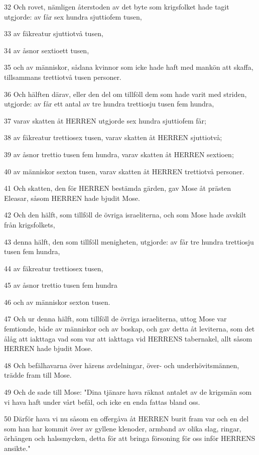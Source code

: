 \par 32 Och rovet, nämligen återstoden av det byte som krigsfolket hade tagit utgjorde: av får sex hundra sjuttiofem tusen,
\par 33 av fäkreatur sjuttiotvå tusen,
\par 34 av åsnor sextioett tusen,
\par 35 och av människor, sådana kvinnor som icke hade haft med mankön att skaffa, tillsammans trettiotvå tusen personer.
\par 36 Och hälften därav, eller den del om tillföll dem som hade varit med striden, utgjorde: av får ett antal av tre hundra trettiosju tusen fem hundra,
\par 37 varav skatten åt HERREN utgjorde sex hundra sjuttiofem får;
\par 38 av fäkreatur trettiosex tusen, varav skatten åt HERREN sjuttiotvå;
\par 39 av åsnor trettio tusen fem hundra, varav skatten åt HERREN sextioen;
\par 40 av människor sexton tusen, varav skatten åt HERREN trettiotvå personer.
\par 41 Och skatten, den för HERREN bestämda gärden, gav Mose åt prästen Eleasar, såsom HERREN hade bjudit Mose.
\par 42 Och den hälft, som tillföll de övriga israeliterna, och som Mose hade avskilt från krigsfolkets,
\par 43 denna hälft, den som tillföll menigheten, utgjorde: av får tre hundra trettiosju tusen fem hundra,
\par 44 av fäkreatur trettiosex tusen,
\par 45 av åsnor trettio tusen fem hundra
\par 46 och av människor sexton tusen.
\par 47 Och ur denna hälft, som tillföll de övriga israeliterna, uttog Mose var femtionde, både av människor och av boskap, och gav detta åt leviterna, som det ålåg att iakttaga vad som var att iakttaga vid HERRENS tabernakel, allt såsom HERREN hade bjudit Mose.
\par 48 Och befälhavarna över härens avdelningar, över- och underhövitsmännen, trädde fram till Mose.
\par 49 Och de sade till Mose: "Dina tjänare hava räknat antalet av de krigsmän som vi hava haft under vårt befäl, och icke en enda fattas bland oss.
\par 50 Därför hava vi nu såsom en offergåva åt HERREN burit fram var och en del som han har kommit över av gyllene klenoder, armband av olika slag, ringar, örhängen och halssmycken, detta för att bringa försoning för oss inför HERRENS ansikte."
